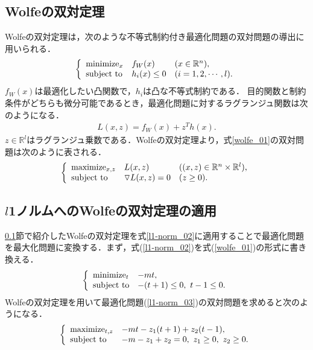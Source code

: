 \documentclass[technicalreport]{ieicej}
\begin{document}
\subsection{Wolfeの双対定理} \label{sec:wolfe}
Wolfeの双対定理は，次のような不等式制約付き最適化問題の双対問題の導出に用いられる．
\begin{equation}
  \left\{
  \begin{array}{lll}
    $minimize$_{x} & f_{W}(x) & (x\in\mathbb{R}^{n}), \\
    $subject to$ & h_{i}(x)\leq 0 & (i=1,2,\cdots,l). \label{wolfe_01}
  \end{array}
  \right.
\end{equation}
$f_{W}(x)$は最適化したい凸関数で，$h_{i}$は凸な不等式制約である．
目的関数と制約条件がどちらも微分可能であるとき，最適化問題に対するラグランジュ関数は次のようになる．
\begin{eqnarray}
  L(x,z) = f_{W}(x)+z^{T}h(x).
\end{eqnarray}
$z\in\mathbb{R}^{l}$はラグランジュ乗数である．Wolfeの双対定理より，式\ref{wolfe_01}の双対問題は次のように表される．
\begin{equation}
  \left\{
  \begin{array}{lll}
    $maximize$_{x,z} & L(x,z) & ((x,z)\in\mathbb{R}^{n}\times\mathbb{R}^{l}), \\
    $subject to$ & \triangledown L(x,z)=0 & (z\geq 0). \label{wolfe_02}
  \end{array}
  \right.
\end{equation}

\subsection{$l$1ノルムへのWolfeの双対定理の適用}
\ref{sec:wolfe}節で紹介したWolfeの双対定理を式\ref{l1-norm_02}に適用することで最適化問題を最大化問題に変換する．まず，式(\ref{l1-norm_02})を式(\ref{wolfe_01})の形式に書き換える．
\begin{equation}
  \left\{
  \begin{array}{ll}
    $minimize$_{t} & -mt, \\
    $subject to$ & -(t+1)\leq 0,\ t-1\leq 0. \label{l1-norm_03}
  \end{array}
  \right.
\end{equation}
Wolfeの双対定理を用いて最適化問題(\ref{l1-norm_03})の双対問題を求めると次のようになる．
\begin{equation}
  \left\{
  \begin{array}{ll}
    $maximize$_{t,z} & -mt-z_{1}(t+1)+z_{2}(t-1), \\
    $subject to$ & -m-z_{1}+z_{2}=0,\ z_{1}\geq 0,\ z_{2}\geq 0. \label{l1-norm_04}
  \end{array}
  \right.
\end{equation}
\end{document}

